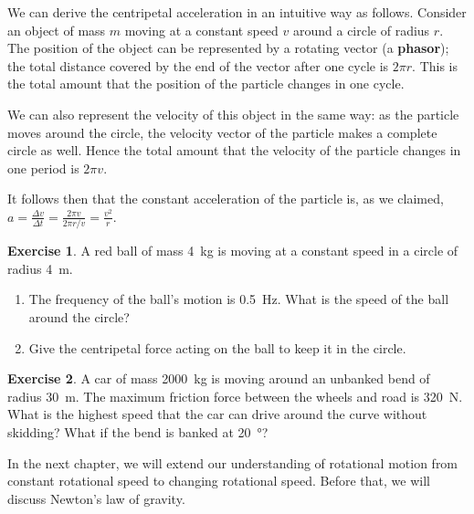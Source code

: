 \documentclass[a4paper]{amsbook}
\theoremstyle{definition}
\newtheorem{exercise}{Exercise}
\numberwithin{exercise}{chapter}
\numberwithin{exercise}{chapter}
\begin{document}
We can derive the centripetal acceleration in an intuitive way as follows. Consider an object of mass $ m $ moving at a constant speed $ v $ around a
circle of radius $ r $. The position of the object can be represented by a rotating vector (a \textbf{phasor}); the total distance covered by the end
of the vector after one cycle is $ 2 \pi r $. This is the total amount that the position of the particle changes in one cycle.

We can also represent the velocity of this object in the same way: as the particle moves around the circle, the velocity
vector of the particle makes a complete circle as well. Hence the total amount that the velocity of the particle changes
in one period is $ 2\pi v $.

It follows then that the constant acceleration of the particle is, as we claimed, $ a = \frac{\Delta v}{\Delta t} = \frac{2\pi v}{2\pi r / v} = \frac{v^2}{r} $.

\begin{exercise}
  A red ball of mass \SI{4}{\kilo\gram} is moving at a constant speed in a circle of radius \SI{4}{\metre}.
  \begin{enumerate}
    \item The frequency of the ball's motion is \SI{0.5}{\hertz}. What is the speed of the ball around the circle?
    \item Give the centripetal force acting on the ball to keep it in the circle.
  \end{enumerate}
\end{exercise}

\begin{exercise}
  A car of mass \SI{2000}{\kilo\gram} is moving around an unbanked bend of radius \SI{30}{\metre}. The maximum friction
  force between the wheels and road is \SI{320}{\newton}. What is the highest speed that the car can drive around the
  curve without skidding? What if the bend is banked at \SI{20}{\degree}?
\end{exercise}

In the next chapter, we will extend our understanding of rotational motion from constant rotational speed
to changing rotational speed. Before that, we will discuss Newton's law of gravity.
\end{document}
